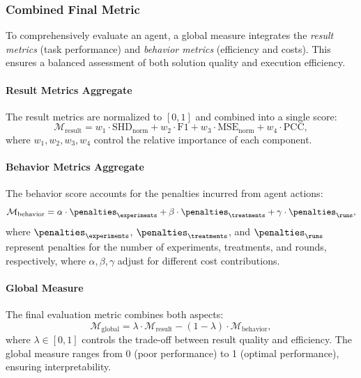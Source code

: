 \documentclass{uai2024} %
\begin{document}
        \subsubsection{Combined Final Metric}
            To comprehensively evaluate an agent, a global measure integrates the \emph{result metrics} (task performance) and \emph{behavior metrics} (efficiency and costs). This ensures a balanced assessment of both solution quality and execution efficiency.
            
            \paragraph{Result Metrics Aggregate}  
                The result metrics are normalized to $[0,1]$ and combined into a single score:
                \begin{equation*}
                    \mathcal{M}_{\text{result}} = w_1 \cdot \text{SHD}_{\text{norm}} + w_2 \cdot \text{F1} + w_3 \cdot \text{MSE}_{\text{norm}} + w_4 \cdot \text{PCC},
                \end{equation*}
                where $ w_1, w_2, w_3, w_4 $ control the relative importance of each component.
            
            \paragraph{Behavior Metrics Aggregate}  
                The behavior score accounts for the penalties incurred from agent actions:
                \begin{equation*}
                    \mathcal{M}_{\text{behavior}} = \alpha \cdot \penalties_{\experiments} + \beta \cdot \penalties_{\treatments} + \gamma \cdot \penalties_{\runs},
                \end{equation*}
                where $\penalties_{\experiments}$, $\penalties_{\treatments}$, and $\penalties_{\runs}$ represent penalties for the number of experiments, treatments, and rounds, respectively, where $ \alpha, \beta, \gamma $ adjust for different cost contributions.
            
            \paragraph{Global Measure}  
                The final evaluation metric combines both aspects:
                \begin{equation*}
                    \mathcal{M}_{\text{global}} = \lambda \cdot \mathcal{M}_{\text{result}} - (1 - \lambda) \cdot \mathcal{M}_{\text{behavior}},
                \end{equation*}
                where $ \lambda \in [0,1] $ controls the trade-off between result quality and efficiency. The global measure ranges from 0 (poor performance) to 1 (optimal performance), ensuring interpretability.
\end{document}
